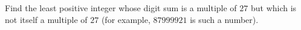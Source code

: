 Find the least positive integer whose digit sum is a multiple of $27$ but which is not itself a multiple of $27$ (for example, $87999921$ is such a number).
